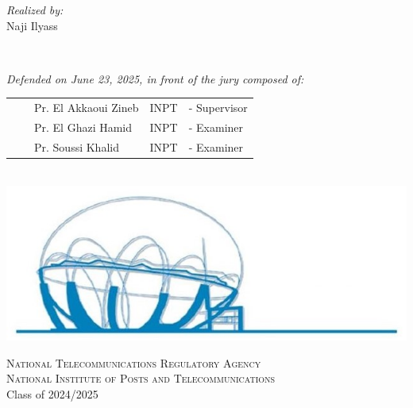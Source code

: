 \begin{titlepage}
\begin{center}
  \noindent
  \begin{minipage}{0.9\textwidth}
    \vspace{-7mm}
    \begin{flushleft} \large
      \emph{Realized by:}\\ \vspace{0.2cm}
      \hspace{0.95cm} Naji Ilyass  \\
    \end{flushleft}
  \end{minipage}
  \begin{minipage}{0.4\textwidth}
  \end{minipage}\\[1.3cm]

  \vspace{0.2cm}

  \begin{minipage}{0.9\textwidth}
    \vspace{-7mm}
    \begin{flushleft} \large
      \emph{Defended on June 23, 2025, in front of the jury composed of:}\\ \vspace{0.3cm}
      \begin{tabular}{ll  l l l}
      &&Pr. El Akkaoui Zineb & INPT  & - Supervisor \\
      &&Pr. El Ghazi Hamid & INPT  & - Examiner \\
      &&Pr. Soussi Khalid & INPT  & - Examiner \\
      \end{tabular}
    \end{flushleft}
  \end{minipage}\\[0.6cm]


  \includegraphics[scale=0.8]{Images/inpt_fig.jpg}
  
  \vspace{0.2cm}
  \textsc{National Telecommunications Regulatory Agency}\\
  \textsc{National Institute of Posts and Telecommunications}\\
  \vspace{0.5cm}
  {\large Class of 2024/2025}
  
  \end{center}
  \end{titlepage}
  